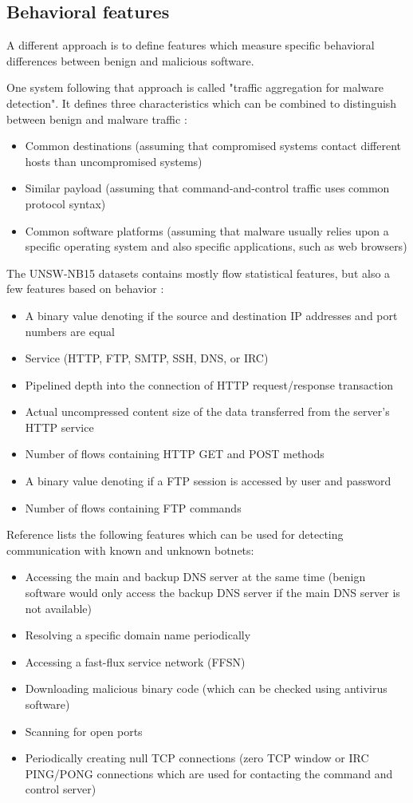 \documentclass[conference]{IEEEtran}
\begin{document}
\subsection{Behavioral features}

A different approach is to define features which measure specific behavioral differences between benign and malicious software.

One system following that approach is called "traffic aggregation for malware detection". It defines three characteristics which can be combined to distinguish between benign and malware traffic \cite{yen2011}:
\begin{itemize}
	\item Common destinations (assuming that compromised systems contact different hosts than uncompromised systems)
	\item Similar payload (assuming that command-and-control traffic uses common protocol syntax)
	\item Common software platforms (assuming that malware usually relies upon a specific operating system and also specific applications, such as web browsers)
\end{itemize}

The UNSW-NB15 datasets contains mostly flow statistical features, but also a few features based on behavior \cite{Nb2015}:
\begin{itemize}
	\item A binary value denoting if the source and destination IP addresses and port numbers are equal
	\item Service (HTTP, FTP, SMTP, SSH, DNS, or IRC)
	\item Pipelined depth into the connection of HTTP request/response transaction
	\item Actual uncompressed content size of the data transferred from the server's HTTP service
	\item Number of flows containing HTTP GET and POST methods
	\item A binary value denoting if a FTP session is accessed by user and password
	\item Number of flows containing FTP commands
\end{itemize}

Reference \cite{li2013} lists the following features which can be used for detecting communication with known and unknown botnets:
\begin{itemize}
	\item Accessing the main and backup DNS server at the same time (benign software would only access the backup DNS server if the main DNS server is not available)
	\item Resolving a specific domain name periodically
	\item Accessing a fast-flux service network (FFSN)
	\item Downloading malicious binary code (which can be checked using antivirus software)
	\item Scanning for open ports
	\item Periodically creating null TCP connections (zero TCP window or IRC PING/PONG connections which are used for contacting the command and control server)
\end{itemize}
\end{document}

